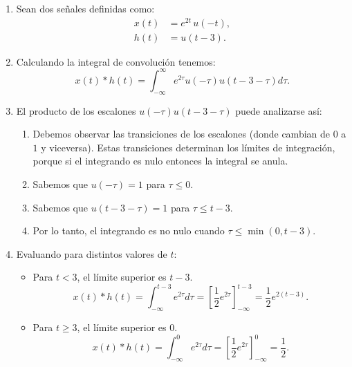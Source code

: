 \begin{enumerate}
	
	\item Sean dos señales definidas como:
	\begin{align}
		x(t) &= e^{2t} \, u(-t) ,  \\
		h(t) &= u(t-3).
	\end{align}
	
	\item Calculando la integral de convolución tenemos:
	\begin{equation}
		x(t) * h(t) = \int_{-\infty}^{\infty} e^{2\tau} u(-\tau) u(t-3-\tau) d\tau .
	\end{equation}
	
	\item El producto de los escalones $u(-\tau) u(t-3-\tau)$ puede analizarse así:
	\begin{enumerate}
		\item Debemos observar las transiciones de los escalones (donde cambian de $0$ a $1$ y viceversa). Estas transiciones determinan los límites de integración, porque si el integrando es nulo entonces la integral se anula.
		\item Sabemos que $u(-\tau) = 1$ para $\tau \leq 0$.
		\item Sabemos que $u(t-3-\tau) = 1$ para $\tau \leq t-3$.
		\item Por lo tanto, el integrando es no nulo cuando $\tau \leq \min(0, t-3)$.
	\end{enumerate}
	
	\item Evaluando para distintos valores de $t$:
	\begin{itemize}
		\item Para $t < 3$, el límite superior es $t-3$. 
		\begin{equation}
			x(t) * h(t) = \int_{-\infty}^{t-3} e^{2\tau} d\tau = \left[ \frac{1}{2}e^{2\tau} \right]_{-\infty}^{t-3} = \frac{1}{2}e^{2(t-3)}.
		\end{equation}
		
		\item Para $t \geq 3$, el límite superior es $0$.
		\begin{equation}
			x(t) * h(t) = \int_{-\infty}^{0} e^{2\tau} d\tau = \left[ \frac{1}{2}e^{2\tau} \right]_{-\infty}^{0} = \frac{1}{2}.
		\end{equation}
	\end{itemize}
	
\end{enumerate}

